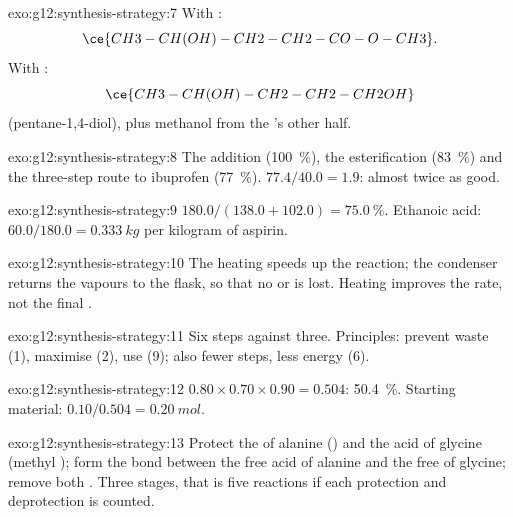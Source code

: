 \begin{solution}{exo:g12:synthesis-strategy:7}
With :
\[ \ce{CH3-CH(OH)-CH2-CH2-CO-O-CH3} . \]
With :
\[ \ce{CH3-CH(OH)-CH2-CH2-CH2OH} \]
(pentane-1,4-diol), plus methanol from the 's other half.
\end{solution}

\begin{solution}{exo:g12:synthesis-strategy:8}
The addition (\qty{100}{\percent}), the esterification
(\qty{83}{\percent}) and the three-step route to ibuprofen
(\qty{77}{\percent}). $77.4/40.0 = 1.9$: almost twice as good.
\end{solution}

\begin{solution}{exo:g12:synthesis-strategy:9}
$180.0/(138.0 + 102.0) = \qty{75.0}{\percent}$. Ethanoic acid:
$60.0/180.0 = \qty{0.333}{kg}$ per kilogram of aspirin.
\end{solution}

\begin{solution}{exo:g12:synthesis-strategy:10}
The heating speeds up the reaction; the condenser returns the vapours
to the flask, so that no  or  is lost. Heating improves
the rate, not the final .
\end{solution}

\begin{solution}{exo:g12:synthesis-strategy:11}
Six steps against three. Principles: prevent waste (1), maximise  (2), use  (9); also fewer steps, less energy (6).
\end{solution}

\begin{solution}{exo:g12:synthesis-strategy:12}
$0.80 \times 0.70 \times 0.90 = 0.504$: \qty{50.4}{\percent}. Starting
material: $0.10/0.504 = \qty{0.20}{mol}$.
\end{solution}

\begin{solution}{exo:g12:synthesis-strategy:13}
Protect the  of alanine () and the acid of glycine (methyl );
form the  bond between the free acid of alanine and the free 
of glycine; remove both . Three stages, that is five
reactions if each protection and deprotection is counted.
\end{solution}


